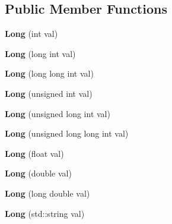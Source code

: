 \subsection*{Public Member Functions}
\begin{DoxyCompactItemize}
\item 
\mbox{\label{classradix_1_1Long_af07721c946aaa24cd0ad0de31c3ca3f3}} 
{\bfseries Long} (int val)
\item 
\mbox{\label{classradix_1_1Long_acac6ededfc5c4018175951b715a583df}} 
{\bfseries Long} (long int val)
\item 
\mbox{\label{classradix_1_1Long_a698b95031b0899c044926d0c0f1f1703}} 
{\bfseries Long} (long long int val)
\item 
\mbox{\label{classradix_1_1Long_a1ef9ea8476ae4e6c629d1cd790603619}} 
{\bfseries Long} (unsigned int val)
\item 
\mbox{\label{classradix_1_1Long_aff3bca9e174962b47124df0249439850}} 
{\bfseries Long} (unsigned long int val)
\item 
\mbox{\label{classradix_1_1Long_af5cdaf8c62a5e4074a4a07a305c4960a}} 
{\bfseries Long} (unsigned long long int val)
\item 
\mbox{\label{classradix_1_1Long_a6bf8d93ea07aa0a5ab24d355de59fbe1}} 
{\bfseries Long} (float val)
\item 
\mbox{\label{classradix_1_1Long_a734b57ccc1afa1996b710c9b3e01495f}} 
{\bfseries Long} (double val)
\item 
\mbox{\label{classradix_1_1Long_a71dc131ba394fd831442af0571cea6b6}} 
{\bfseries Long} (long double val)
\item 
\mbox{\label{classradix_1_1Long_a5cb8e4b96d292631c8af62195ecfb784}} 
{\bfseries Long} (std\+::string val)
\item 
\mbox{\label{classradix_1_1Long_acaa8b35cf83b7595aa33856ba88b19ea}} 

\end{DoxyCompactItemize}

